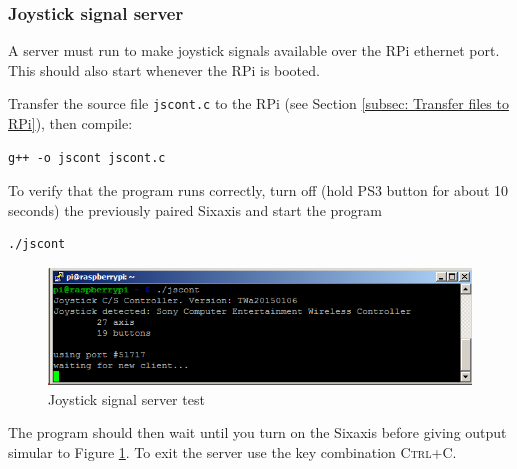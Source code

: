 \documentclass[a4paper,twoside,english]{report}
\newcommand{\noun}[1]{\textsc{#1}}
\begin{document}
\paragraph{}


\subsubsection{Joystick signal server}

A server must run to make joystick signals available over the RPi
ethernet port. This should also start whenever the RPi is booted.

Transfer the source file \texttt{jscont.c} to the RPi (see Section
\ref{subsec: Transfer files to RPi}), then compile:

\begin{verbatim}g++ -o jscont jscont.c\end{verbatim}

To verify that the program runs correctly, turn off (hold PS3 button
for about 10 seconds) the previously paired Sixaxis and start the
program

\begin{verbatim}./jscont\end{verbatim}

\begin{figure}[h!]
\centering \includegraphics[scale=0.45]{fig/RPi_jscont} \caption{Joystick signal server test}
\label{fig: RPi joystick server} 
\end{figure}

The program should then wait until you turn on the Sixaxis before
giving output simular to Figure \ref{fig: RPi joystick server}. To
exit the server use the key combination \noun{Ctrl+C}.
\end{document}
